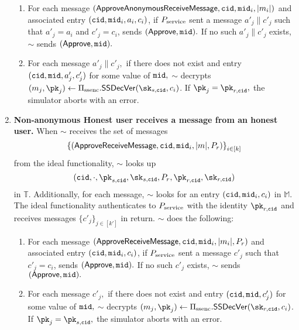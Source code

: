 \begin{enumerate}
	\begin{enumerate}
		\item For each message $(\mathsf{ApproveAnonymousReceiveMessage}, \allowbreak \mathtt{cid}, \mathtt{mid}_i, |m_i|)$ and associated entry $(\mathtt{cid}, \mathtt{mid}_i, a_i, c_i)$, if $P_{\text{service}}$ sent a message $a'_j \| c'_j$ such that $a'_j=a_i$ and $c'_j=c_i$, sends $(\mathsf{Approve}, \mathtt{mid}).$ If no such $a'_j \| c'_j$ exists, $\sim$ sends $(\mathsf{Approve}, \mathtt{mid}).$
		\item For each message $a'_j \| c'_j,$ if there does not exist and entry $(\mathtt{cid}, \mathtt{mid}, a'_j, c'_j)$ for some value of $\mathtt{mid},$ $\sim$ decrypts $(m_j,\pk_j) \leftarrow \sealedsenderencryptionscheme.\sealedsenderencryptionvdec(\sk_{s,\convoid}, c_i)$.
                If
                $\pk_j=\pk_{r,\convoid},$ the simulator aborts with an error.
	\end{enumerate} 

	\item \textbf{Non-anonymous Honest user receives a message from an honest user.}  When $\sim$ receives the set of messages { \small $$\left\{(\mathsf{ApproveReceiveMessage}, \mathtt{cid}, \mathtt{mid}_i, |m|, P_r)\right\}_{i\in[k]}$$ } from the ideal functionality, $\sim$ looks up $$(\convoid, \cdot, \pk_{s,\convoid}, \sk_{s,\convoid}, P_r, \pk_{r,\convoid}, \sk_{r,\convoid})$$ in $\mathbb{T}.$ Additionally, for each message, $\sim$ looks for an entry $(\mathtt{cid}, \mathtt{mid}_i, c_i)$ in $\mathbb{M}.$  The ideal functionality authenticates to $P_{\text{service}}$ with the identity $\pk_{r,\convoid}$ and receives messages $\{c'_j\}_{j\in[k']}$ in return. $\sim$ does the following:

	\begin{enumerate}
		\item For each message $(\mathsf{ApproveReceiveMessage}, \mathtt{cid}, \mathtt{mid}_i, \allowbreak |m_i|, P_r)$ and associated entry $(\mathtt{cid}, \mathtt{mid}_i, c_i)$, if $P_{\text{service}}$ sent a message $c'_j$ such that $c'_j=c_i$, sends $(\mathsf{Approve}, \mathtt{mid}).$ If no such $c'_j$ exists, $\sim$ sends $(\mathsf{Approve}, \mathtt{mid}).$
		\item For each message $c'_j,$ if there does not exist and entry $(\mathtt{cid}, \mathtt{mid}, c'_j)$ for some value of $\mathtt{mid},$ $\sim$ decrypts $(m_j,\pk_j) \leftarrow \sealedsenderencryptionscheme.\sealedsenderencryptionvdec(\sk_{r,\convoid}, c_i)$.  If
                $\pk_j=\pk_{s,\convoid},$ the simulator aborts with an error.
	\end{enumerate} 


\end{enumerate}
